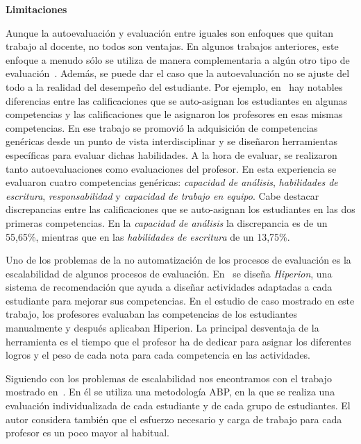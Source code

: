 \bigskip
\textbf{Limitaciones}
\bigskip

Aunque la autoevaluación y evaluación entre iguales son enfoques que quitan trabajo al docente, no todos son ventajas. En algunos trabajos anteriores, este enfoque a menudo sólo se utiliza de manera complementaria a algún otro tipo de evaluación~\cite{lasa2013problem,sevilla2012assessment,khamis2012measurement,barbera2011assessment,pinto2011assessment}. Además, se puede dar el caso que la autoevaluación no se ajuste del todo a la realidad del desempeño del estudiante. Por ejemplo, en~\cite{carreras2013promotion} hay notables diferencias entre las calificaciones que se auto-asignan los estudiantes en algunas competencias y las calificaciones que le asignaron los profesores en esas mismas competencias. En ese trabajo se promovió la adquisición de competencias genéricas desde un punto de vista interdisciplinar y se diseñaron herramientas específicas para evaluar dichas habilidades. A la hora de evaluar, se realizaron tanto autoevaluaciones como evaluaciones del profesor. En esta experiencia se evaluaron cuatro competencias genéricas: \emph{capacidad de análisis},  \emph{habilidades de escritura}, \emph{responsabilidad} y \emph{capacidad de trabajo en equipo}. Cabe destacar discrepancias entre las calificaciones que se auto-asignan los estudiantes en las dos primeras competencias. En la \emph{capacidad de análisis} la discrepancia es de un 55,65\%, mientras que en las \emph{habilidades de escritura} de un 13,75\%.

Uno de los problemas de la no automatización de los procesos de evaluación es la escalabilidad de algunos procesos de evaluación. En~\cite{serrano2013hiperion} se diseña \emph{Hiperion}, una sistema de recomendación que ayuda a diseñar actividades adaptadas a cada estudiante para mejorar sus competencias. En el estudio de caso mostrado en este trabajo, los profesores evaluaban las competencias de los estudiantes manualmente y después aplicaban Hiperion. La principal desventaja de la herramienta es el tiempo que el profesor ha de dedicar para asignar los diferentes logros y el peso de cada nota para cada competencia en las actividades.

Siguiendo con los problemas de escalabilidad nos encontramos con el trabajo mostrado en~\cite{lacuesta2009active}. En él se utiliza una metodología ABP, en la que se realiza una evaluación individualizada de cada estudiante y de cada grupo de estudiantes. El autor considera también que el esfuerzo necesario y carga de trabajo para cada profesor es un poco mayor al habitual. 

